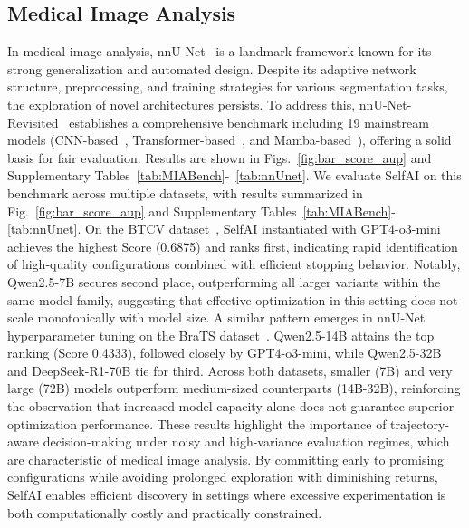 \subsection{Medical Image Analysis}
In medical image analysis, nnU-Net~\cite{nnunet} is a landmark framework known for its strong generalization and automated design. Despite its adaptive network structure, preprocessing, and training strategies for various segmentation tasks, the exploration of novel architectures persists. To address this, nnU-Net-Revisited~\cite{nnunet_revisit} establishes a comprehensive benchmark including 19 mainstream models (CNN-based~\cite{ronneberger2015u,nnunet,roy2023mednext}, Transformer-based~\cite{vaswani2017attention,tang2022self}, and Mamba-based~\cite{gu2023mamba,ma2024u}), offering a solid basis for fair evaluation. Results are shown in Figs.~\ref{fig:bar_score_aup} and Supplementary Tables~\ref{tab:MIABench}-~\ref{tab:nnUnet}. We evaluate SelfAI on this benchmark across multiple datasets, with results summarized in Fig.~\ref{fig:bar_score_aup} and Supplementary Tables~\ref{tab:MIABench}-\ref{tab:nnUnet}. On the BTCV dataset~\cite{btcv}, SelfAI instantiated with GPT4-o3-mini achieves the highest Score (0.6875) and ranks first, indicating rapid identification of high-quality configurations combined with efficient stopping behavior. Notably, Qwen2.5-7B secures second place, outperforming all larger variants within the same model family, suggesting that effective optimization in this setting does not scale monotonically with model size. A similar pattern emerges in nnU-Net hyperparameter tuning on the BraTS dataset~\cite{brats}. Qwen2.5-14B attains the top ranking (Score 0.4333), followed closely by GPT4-o3-mini, while Qwen2.5-32B and DeepSeek-R1-70B tie for third. Across both datasets, smaller (7B) and very large (72B) models outperform medium-sized counterparts (14B-32B), reinforcing the observation that increased model capacity alone does not guarantee superior optimization performance. These results highlight the importance of trajectory-aware decision-making under noisy and high-variance evaluation regimes, which are characteristic of medical image analysis. By committing early to promising configurations while avoiding prolonged exploration with diminishing returns, SelfAI enables efficient discovery in settings where excessive experimentation is both computationally costly and practically constrained.

